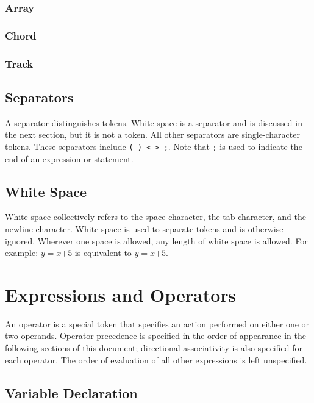 \documentclass[letterpaper]{article}
\begin{document}
\subsubsection{Array}
\subsubsection{Chord}
\subsubsection{Track}

\subsection{Separators}
A separator distinguishes tokens. White space is a separator and is discussed in the next section, but it is not a token. All other separators are single-character tokens. These separators include \texttt{( ) \textless\  \textgreater\  ;}. Note that \texttt{;}  is used to indicate the end of an expression or statement. 

\subsection{White Space}
White space collectively refers to the space character, the tab character, and the newline character. White space is used to separate tokens and is otherwise ignored. Wherever one space is allowed, any length of white space is allowed.
For example: $y$$=$$x$$+$$5$ is equivalent to $y$\textvisiblespace $=$\textvisiblespace  \textvisiblespace $x$\textvisiblespace $+$\textvisiblespace $5$.

\section{Expressions and Operators}
An operator is a special token that specifies an action performed on either one or two operands. Operator precedence is specified in the order of appearance in the following sections of this document; directional associativity is also specified for each operator. The order of evaluation of all other expressions is left unspecified.

\subsection{Variable Declaration}
\end{document}
